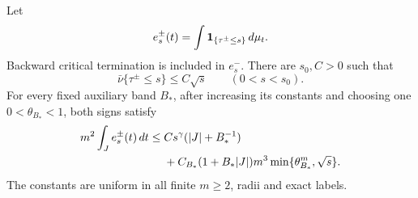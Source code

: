 \begin{lemma}\label{lem:v90-ends}
Let
\[
 e_s^\pm(t)=\int\mathbf1_{\{\tau^\pm\le s\}}\,d\mu_t.
\]
Backward critical termination is included in $e_s^-$. There are
$s_0,C>0$ such that
\begin{equation}\label{eq:v90-end-cap}
 \bar\nu\{\tau^\pm\le s\}\le C\sqrt s\qquad(0<s<s_0).
\end{equation}
For every fixed auxiliary band $B_*$, after increasing its constants
and choosing one $0<\theta_{B_*}<1$, both signs satisfy
\begin{align}
 m^2\int_J e_s^\pm(t)\,dt
 \le{}& Cs^\gamma(|J|+B_*^{-1})\notag\\
 &+C_{B_*}(1+B_*|J|)m^3
                        \min\{\theta_{B_*}^{m},\sqrt s\}.
                                             \label{eq:v90-end-finite}
\end{align}
The constants are uniform in all finite $m\ge2$, radii and exact labels.
\end{lemma}
